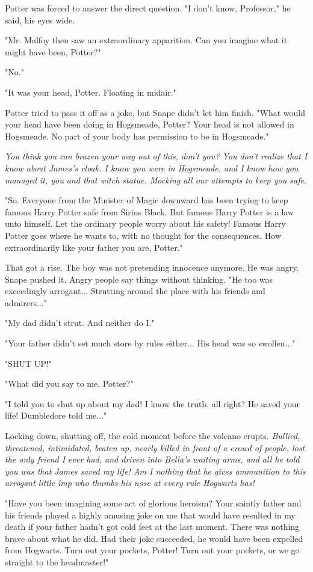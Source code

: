 Potter was forced to answer the direct question. "I don't know, Professor," he said, his eyes wide.

"Mr. Malfoy then saw an extraordinary apparition. Can you imagine what it might have been, Potter?"

"No."

"It was your head, Potter. Floating in midair."

Potter tried to pass it off as a joke, but Snape didn't let him finish. "What would your head have been doing in Hogsmeade, Potter? Your head is not allowed in Hogsmeade. No part of your body has permission to be in Hogsmeade."

\emph{You think you can brazen your way out of this, don't you? You don't realize that I know about James's cloak. I know you were in Hogsmeade, and I know how you managed it, you and that witch statue. Mocking all our attempts to keep you safe.}

"So. Everyone from the Minister of Magic downward has been trying to keep famous Harry Potter safe from Sirius Black. But famous Harry Potter is a law unto himself. Let the ordinary people worry about his safety! Famous Harry Potter goes where he wants to, with no thought for the consequences. How extraordinarily like your father you are, Potter."

That got a rise. The boy was not pretending innocence anymore. He was angry. Snape pushed it. Angry people say things without thinking. "He too was exceedingly arrogant... Strutting around the place with his friends and admirers..."

"My dad didn't strut. And neither do I."

"Your father didn't set much store by rules either... His head was so swollen..."

"SHUT UP!"

"What did you say to me, Potter?"

"I told you to shut up about my dad! I know the truth, all right? He saved your life! Dumbledore told me..."

Locking down, shutting off, the cold moment before the volcano erupts. \emph{Bullied, threatened, intimidated, beaten up, nearly killed in front of a crowd of people, lost the only friend I ever had, and driven into Bella's waiting arms, and all he told you was that James saved my life! Am I nothing that he gives ammunition to this arrogant little imp who thumbs his nose at every rule Hogwarts has!}

"Have you been imagining some act of glorious heroism? Your saintly father and his friends played a highly amusing joke on me that would have resulted in my death if your father hadn't got cold feet at the last moment. There was nothing brave about what he did. Had their joke succeeded, he would have been expelled from Hogwarts. Turn out your pockets, Potter! Turn out your pockets, or we go straight to the headmaster!"

